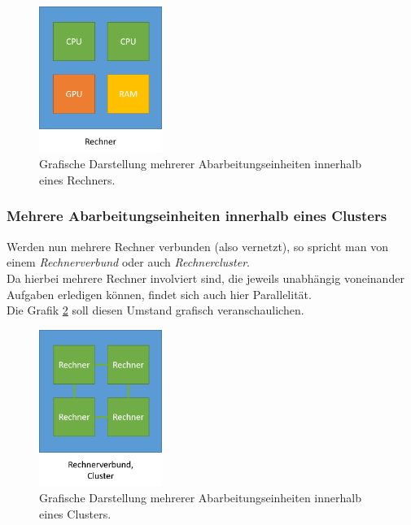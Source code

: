 				\begin{figure}
					\centering	
					\includegraphics[width=4cm]{Abbildungen/Ebenen_der_Parallelitaet_Rechner.png}
					\caption{Grafische Darstellung mehrerer Abarbeitungseinheiten innerhalb eines Rechners.}
					\label{fig:EbenenDerParallelitaetRechner}
				\end{figure}
			
			\subsubsection{Mehrere Abarbeitungseinheiten innerhalb eines Clusters}
				\label{MehrereAbarbeitungseinheitenCluster}
			
				Werden nun mehrere Rechner verbunden (also vernetzt), so spricht man von einem \textit{Rechnerverbund} oder auch \textit{Rechnercluster}. \cite{RechnerverbundWikipedia}\\
				Da hierbei mehrere Rechner involviert sind, die jeweils unabhängig voneinander Aufgaben erledigen können, findet sich auch hier Parallelität.\\
				Die Grafik \ref{fig:EbenenDerParallelitaetCluster} soll diesen Umstand grafisch veranschaulichen.
				
				\begin{figure}
					\centering	
					\includegraphics[width=4cm]{Abbildungen/Ebenen_der_Parallelitaet_Cluster.png}
					\caption{Grafische Darstellung mehrerer Abarbeitungseinheiten innerhalb eines Clusters.}
					\label{fig:EbenenDerParallelitaetCluster}
				\end{figure}
			
